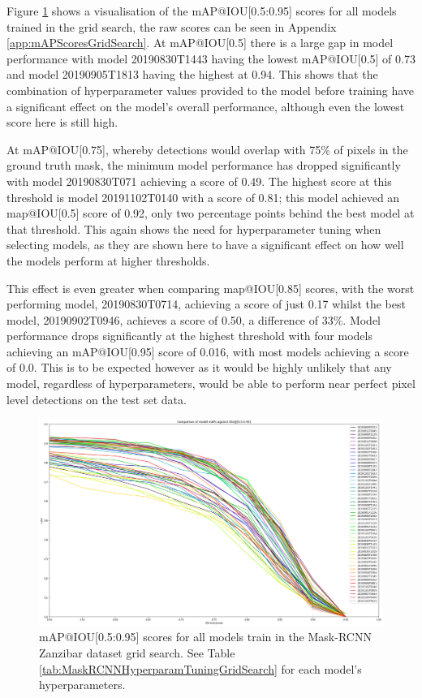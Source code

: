 Figure \ref{fig:mAP-graph} shows a visualisation of the mAP@IOU[0.5:0.95] scores for all models trained in the grid search, the raw scores can be seen in Appendix \ref{app:mAPScoresGridSearch}. At mAP@IOU[0.5] there is a large gap in model performance with model 20190830T1443 having the lowest mAP@IOU[0.5] of 0.73 and model 20190905T1813 having the highest at 0.94. This shows that the combination of hyperparameter values provided to the model before training have a significant effect on the model's overall performance, although even the lowest score here is still high. 

At mAP@IOU[0.75], whereby detections would overlap with 75\% of pixels in the ground truth mask, the minimum model performance has dropped significantly with model 20190830T071 achieving a score of 0.49. The highest score at this threshold is model 20191102T0140 with a score of 0.81; this model achieved an map@IOU[0.5] score of 0.92, only two percentage points behind the best model at that threshold. This again shows the need for hyperparameter tuning when selecting models, as they are shown here to have a significant effect on how well the models perform at higher thresholds.

This effect is even greater when comparing map@IOU[0.85] scores, with the worst performing model, 20190830T0714,  achieving a score of just 0.17 whilst the best model, 20190902T0946, achieves a score of 0.50, a difference of 33\%. Model performance drops significantly at the highest threshold with four models achieving an mAP@IOU[0.95] score of 0.016, with most models achieving a score of 0.0. This is to be expected however as it would be highly unlikely that any model, regardless of hyperparameters, would be able to perform near perfect pixel level detections on the test set data. 

\begin{figure}[h]
	\begin{center}
		\includegraphics[scale=0.33]{Chapter3/figs/comparison_graph_all_diff_colours.png}
	\end{center}
	\caption{mAP@IOU[0.5:0.95] scores for all models train in the Mask-RCNN Zanzibar dataset grid search. See Table \ref{tab:MaskRCNNHyperparamTuningGridSearch} for each model's hyperparameters.}
	\label{fig:mAP-graph}
\end{figure}

